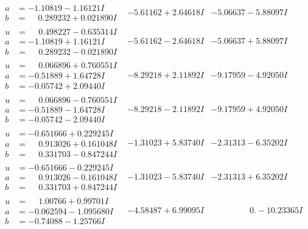\documentclass[1p]{elsarticle_modified}
\theoremstyle{definition}
\begin{document}
$$\begin{array}{c|c|c}
\begin{aligned}
a &= -1.10819 - 1.16121 I \\
b &= \phantom{-}0.289232 + 0.021890 I\end{aligned}
 & -5.61162 + 2.64618 I & -5.06637 - 5.88097 I \\ \hline\begin{aligned}
u &= \phantom{-}0.498227 - 0.635314 I \\
a &= -1.10819 + 1.16121 I \\
b &= \phantom{-}0.289232 - 0.021890 I\end{aligned}
 & -5.61162 - 2.64618 I & -5.06637 + 5.88097 I \\ \hline\begin{aligned}
u &= \phantom{-}0.066896 + 0.760551 I \\
a &= -0.51889 + 1.64728 I \\
b &= -0.05742 + 2.09440 I\end{aligned}
 & -8.29218 + 2.11892 I & -9.17959 - 4.92050 I \\ \hline\begin{aligned}
u &= \phantom{-}0.066896 - 0.760551 I \\
a &= -0.51889 - 1.64728 I \\
b &= -0.05742 - 2.09440 I\end{aligned}
 & -8.29218 - 2.11892 I & -9.17959 + 4.92050 I \\ \hline\begin{aligned}
u &= -0.651666 + 0.229245 I \\
a &= \phantom{-}0.913026 + 0.161048 I \\
b &= \phantom{-}0.331703 - 0.847244 I\end{aligned}
 & -1.31023 + 5.83740 I & -2.31313 - 6.35202 I \\ \hline\begin{aligned}
u &= -0.651666 - 0.229245 I \\
a &= \phantom{-}0.913026 - 0.161048 I \\
b &= \phantom{-}0.331703 + 0.847244 I\end{aligned}
 & -1.31023 - 5.83740 I & -2.31313 + 6.35202 I \\ \hline\begin{aligned}
u &= \phantom{-}1.00766 + 0.99701 I \\
a &= -0.062594 - 1.095680 I \\
b &= -0.74088 - 1.25766 I\end{aligned}
 & -4.58487 + 6.99095 I & \phantom{-0.000000 } 0. - 10.23365 I \\ \hline\begin{aligned}

\end{aligned}
\end{array}$$
\end{document}
